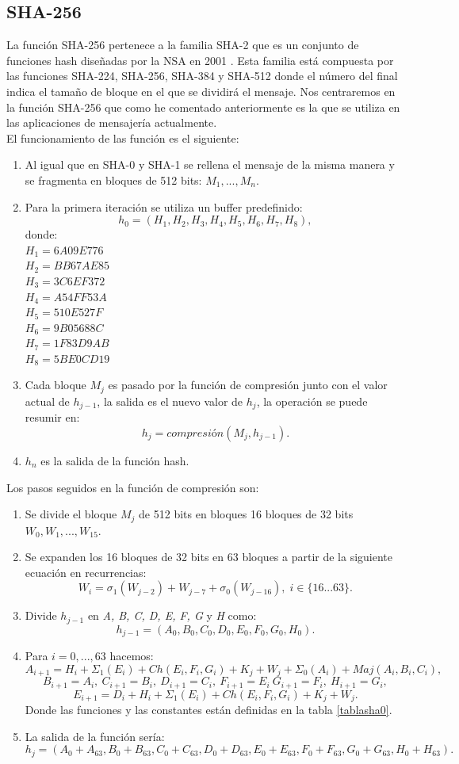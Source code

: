 \subsection{SHA-256}
La función SHA-256 pertenece a la familia SHA-2 que es un conjunto de funciones hash diseñadas por la NSA en 2001 \cite{Penard2008}. Esta familia está compuesta por las funciones SHA-224, SHA-256, SHA-384 y SHA-512 donde el número del final indica el tamaño de bloque en el que se dividirá el mensaje. Nos centraremos en la función SHA-256 que como he comentado anteriormente es la que se utiliza en las aplicaciones de mensajería actualmente.\\
El funcionamiento de las función es el siguiente\cite{Function2016}:\\
\begin{enumerate}
	\item Al igual que en SHA-0 y SHA-1 se rellena el mensaje de la misma manera y se fragmenta en bloques de 512 bits: $M_1,...,M_n$.
	\item Para la primera iteración se utiliza un buffer predefinido:
	$$
		h_0=(H_1, H_2, H_3, H_4, H_5, H_6, H_7, H_8),
	$$
	donde:\\
	$H_1=6A09E776$\\
	$H_2=BB67AE85$\\
	$H_3=3C6EF372$\\
	$H_4=A54FF53A$\\
	$H_5=510E527F$\\
	$H_6=9B05688C$\\
	$H_7=1F83D9AB$\\
	$H_8=5BE0CD19$\\
	\item Cada bloque $M_j$ es pasado por la función de compresión junto con el valor actual de $h_{j-1}$, la salida es el nuevo valor de $h_j$, la operación se puede resumir en:
	$$
		h_j=compresión(M_j,h_{j-1}).
	$$
	\item $h_n$ es la salida de la función hash.
\end{enumerate}
Los pasos seguidos en la función de compresión son:
\begin{enumerate}
	\item Se divide el bloque $M_j$ de 512 bits en bloques 16 bloques de 32 bits $W_0,W_1,...,W_{15}$. 
	\item Se expanden los 16 bloques de 32 bits en 63 bloques a partir de la siguiente ecuación en recurrencias:
	$$
		W_i=\sigma_1(W_{j-2})+W_{j-7}+\sigma_0(W_{j-16}),\; i \in \{16...63\}.
	$$
	\item Divide $h_{j-1}$ en \emph{A, B, C, D, E, F, G} y \emph{H} como:
	$$
		h_{j-1} = (A_0, B_0, C_0, D_0, E_0, F_0, G_0, H_0).
	$$
	\item Para $i=0,...,63$ hacemos:
	$$
		A_{i+1}=H_i+\Sigma_1(E_i)+Ch(E_i,F_i,G_i)+K_j+W_j+\Sigma_0(A_i)+Maj(A_i,B_i,C_i),
	$$
	$$
		B_{i+1}=A_i,\: C_{i+1}=B_i,\: D_{i+1}=C_i,\: F_{i+1}=E_i\: G_{i+1}=F_i,\: H_{i+1}=G_i,
	$$
	$$
		E_{i+1}=D_i+H_i+\Sigma_1(E_i)+Ch(E_i,F_i,G_i)+K_j+W_j.
	$$
	Donde las funciones y las constantes están definidas en la tabla \ref{tablasha0}.
	\item La salida de la función sería:
	$$
		h_j=(A_0+A_{63}, B_0+B_{63}, C_0+C_{63}, D_0+D_{63}, E_0+E_{63}, F_0+F_{63}, G_0+G_{63}, H_0+H_{63}).
	$$
\end{enumerate}
